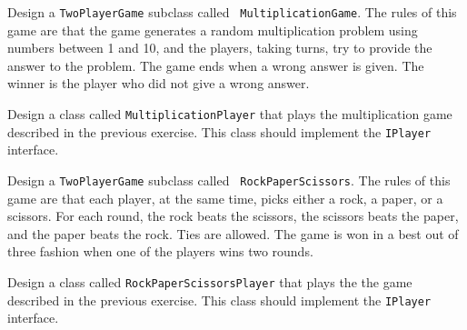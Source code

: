 \begin{EXRtwo}
\item Design a {\tt TwoPlayerGame} subclass called {\tt
Multi\-plication\-Game}.  The rules of this game are that the game
generates a random multiplication problem using numbers between 1 and
10, and the players, taking turns, try to provide the answer to
the problem. The game ends when a wrong answer is given. The winner
is the player who did not give a wrong answer. 

\item Design a class called {\tt MultiplicationPlayer} that plays the
multiplication game described in the previous exercise.  This class
should implement the {\tt IPlayer} interface.

\item Design a {\tt TwoPlayerGame} subclass called {\tt
Rock\-Paper\-Scis\-sors}.  The rules of this game are that each player, at
the same time, picks either a rock, a paper, or a scissors. For each
round, the rock beats the scissors, the scissors beats the paper, and
the paper beats the rock. Ties are allowed.  The game is won in a best 
out of three fashion when one of the players wins two rounds.

\item Design a class called {\tt RockPaperScissorsPlayer} that plays
the the game described in the previous exercise.  This class should
implement the {\tt IPlayer} interface.

\end{EXRtwo}

